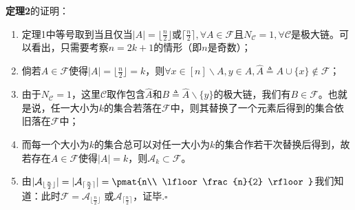 \textbf{定理2}的证明：
\begin{enumerate}
\item 定理1中等号取到当且仅当$|A|=\lfloor\frac{n}{2} \rfloor$或$\lceil\frac{n}{2} \rceil,\forall A\in \mathcal{F}$且$N_{\mathcal{C}}=1,\forall \mathcal{C}$是极大链。可以看出，只需要考察$n=2k+1$的情形（即$n$是奇数）；
\item 倘若$A\in \mathcal{F}$使得$|A|=\lfloor\frac{n}{2} \rfloor=k$，则$\forall x\in [n]\backslash A,y\in A,\hat{A}\triangleq A\cup\{x\}\notin \mathcal{F}$；
\item 由于$N_{\mathcal{C}}=1$，这里$\mathcal{C}$取作包含$\hat{A}$和$B\triangleq \hat{A}\backslash\{y\}$的极大链，我们有$B\in \mathcal{F}$。也就是说，任一大小为$k$的集合若落在$\mathcal{F}$中，则其替换了一个元素后得到的集合依旧落在$\mathcal{F}$中；
\item 而每一个大小为$k$的集合总可以对任一大小为$k$的集合作若干次替换后得到，故若存在$A\in \mathcal{F}$使得$|A|=k$，则$\mathcal{A}_k\subset \mathcal{F}$。
\item 由$|\mathcal{A}_{\lfloor\frac{n}{2} \rfloor}|=| \mathcal{A}_{\lceil\frac{n}{2} \rceil}|=\pmat{n\\ \lfloor\frac{n}{2} \rfloor}$我们知道：此时$\mathcal{F}=\mathcal{A}_{\lfloor\frac{n}{2} \rfloor}$ 或$ \mathcal{A}_{\lceil\frac{n}{2} \rceil}$，证毕.$\square$
\end{enumerate}




